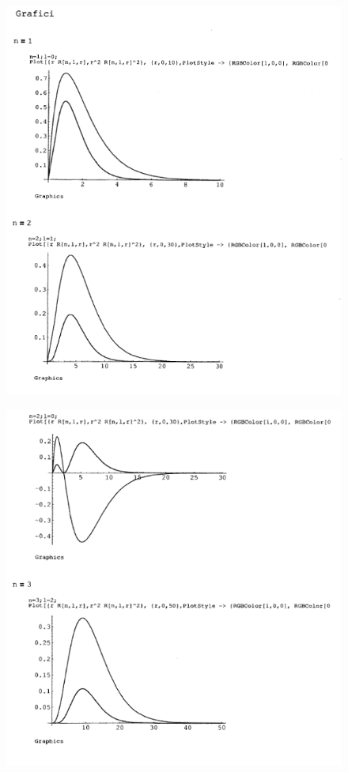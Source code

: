 \documentclass[a4paper,12pt,oneside]{book}
\begin{document}
\begin{figure}[!htbp]
\begin{center}
\includegraphics[width= \textwidth]{immagini/cap_21/fig_21_3.png}\\
\end{center}
\end{figure}
\begin{figure}[!htbp]
\begin{center}
\includegraphics[width= \textwidth]{immagini/cap_21/fig_21_4.png}\\
\end{center}
\end{figure}
\end{document}
